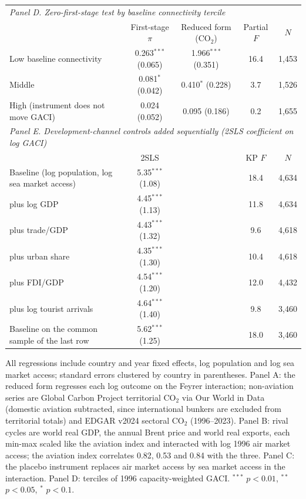 \documentclass[12pt]{extarticle}
\begin{document}
\begin{table}[H]
{\begin{threeparttable}
\begin{tabular}{lcccc}
\midrule
\multicolumn{5}{l}{\textit{Panel D. Zero-first-stage test by baseline connectivity tercile}} \\
 & First-stage $\pi$ & Reduced form (CO$_2$) & Partial $F$ & $N$ \\
  Low baseline connectivity & 0.263$^{***}$ (0.065) & 1.966$^{***}$ (0.351) & 16.4 & 1,453 \\
  Middle & 0.081$^{*}$ (0.042) & 0.410$^{*}$ (0.228) & 3.7 & 1,526 \\
  High (instrument does not move GACI) & 0.024 (0.052) & 0.095 (0.186) & 0.2 & 1,655 \\
\midrule
\multicolumn{5}{l}{\textit{Panel E. Development-channel controls added sequentially (2SLS coefficient on log GACI)}} \\
 & 2SLS & & KP $F$ & $N$ \\
  Baseline (log population, log sea market access) & 5.35$^{***}$ (1.08) & & 18.4 & 4,634 \\
  \quad plus log GDP & 4.45$^{***}$ (1.13) & & 11.8 & 4,634 \\
  \quad plus trade/GDP & 4.43$^{***}$ (1.32) & & 9.6 & 4,618 \\
  \quad plus urban share & 4.35$^{***}$ (1.30) & & 10.4 & 4,618 \\
  \quad plus FDI/GDP & 4.54$^{***}$ (1.20) & & 12.0 & 4,432 \\
  \quad plus log tourist arrivals & 4.64$^{***}$ (1.40) & & 9.8 & 3,460 \\
  Baseline on the common sample of the last row & 5.62$^{***}$ (1.25) & & 18.0 & 3,460 \\
\bottomrule
\end{tabular}
\begin{tablenotes}\scriptsize
\item All regressions include country and year fixed effects, log population and log sea market access; standard errors clustered by country in parentheses. Panel A: the reduced form regresses each log outcome on the Feyrer interaction; non-aviation series are Global Carbon Project territorial CO$_2$ via Our World in Data (domestic aviation subtracted, since international bunkers are excluded from territorial totals) and EDGAR v2024 sectoral CO$_2$ (1996--2023). Panel B: rival cycles are world real GDP, the annual Brent price and world real exports, each min-max scaled like the aviation index and interacted with log 1996 air market access; the aviation index correlates 0.82, 0.53 and 0.84 with the three. Panel C: the placebo instrument replaces air market access by sea market access in the interaction. Panel D: terciles of 1996 capacity-weighted GACI. $^{***}$ $p<0.01$, $^{**}$ $p<0.05$, $^{*}$ $p<0.1$.
\end{tablenotes}
\end{threeparttable}}
\end{table}
\end{document}
